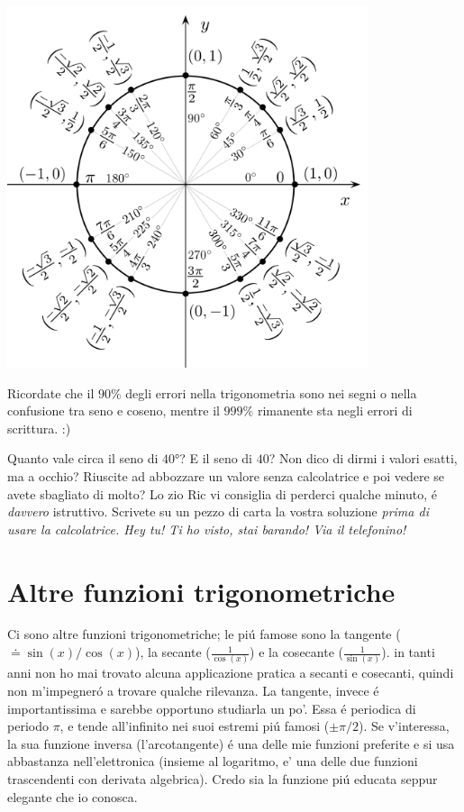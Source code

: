 \includegraphics[height = 300pt, width = 300pt]{images/04trigonometria/seni_coseni_per_angolo.png}

Ricordate che il $90\%$ degli errori nella trigonometria sono nei segni o nella confusione tra seno e coseno, mentre il $999\%$ rimanente sta negli errori di scrittura. :)

\begin{esercizio}
Quanto vale circa il seno di $\ang{40}$? E il seno di $40$? Non dico di dirmi i valori esatti, ma a occhio? Riuscite ad abbozzare un valore senza calcolatrice
e poi vedere se avete sbagliato di molto? Lo zio Ric vi consiglia di perderci qualche minuto, \'e {\em davvero} istruttivo. Scrivete su un pezzo di carta
la vostra soluzione \em{prima} di usare la calcolatrice. \emph{Hey tu! Ti ho visto, stai barando! Via il telefonino!}
\end{esercizio}


\section{Altre funzioni trigonometriche}

Ci sono altre funzioni trigonometriche; le pi\'u famose sono la tangente ($\doteq \sin(x)/\cos(x)$),
la secante ($\frac{1}{\cos(x)}$) e la cosecante ($\frac{1}{\sin(x)}$). in tanti anni non ho mai trovato alcuna applicazione
pratica a secanti e cosecanti, quindi non m'impegner\'o a trovare qualche rilevanza.
La tangente, invece \'e importantissima e sarebbe opportuno studiarla un po'. Essa \'e periodica di periodo $\pi$, e
tende all'infinito nei suoi estremi pi\'u famosi ($\pm \pi/2$). Se v'interessa, la sua funzione inversa (l'arcotangente)
\'e una delle mie funzioni preferite e si usa abbastanza nell'elettronica (insieme al logaritmo, e' una delle due funzioni trascendenti con derivata algebrica).
Credo sia la funzione pi\'u educata seppur elegante che io conosca.
